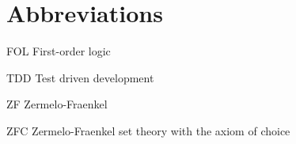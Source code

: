 
\chapter*{Abbreviations}

\begin{flushleft}

FOL \hfill  First-order logic

TDD \hfill Test driven development

ZF \hfill Zermelo-Fraenkel

ZFC \hfill Zermelo-Fraenkel set theory with the axiom of choice

\end{flushleft}